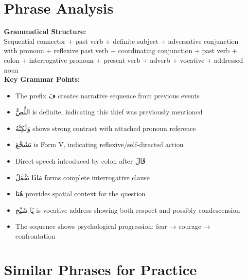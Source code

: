 \documentclass[letterpaper,12pt]{article}
\begin{document}
\section{Phrase Analysis}
\begin{tcolorbox}[colback=boxcolor,colframe=headercolor,breakable]
\textbf{Grammatical Structure:}\\
Sequential connector + past verb + definite subject + adversative conjunction with pronoun + reflexive past verb + coordinating conjunction + past verb + colon + interrogative pronoun + present verb + adverb + vocative + addressed noun \\

\textbf{Key Grammar Points:}
\begin{itemize}
\item The prefix \textarabic{فَ} creates narrative sequence from previous events
\item \textarabic{اللِّصُّ} is definite, indicating this thief was previously mentioned
\item \textarabic{وَلَكِنَّهُ} shows strong contrast with attached pronoun reference
\item \textarabic{تَشَجَّعَ} is Form V, indicating reflexive/self-directed action
\item Direct speech introduced by colon after \textarabic{قَالَ}
\item \textarabic{مَاذَا تَفْعَلُ} forms complete interrogative clause
\item \textarabic{هُنَا} provides spatial context for the question
\item \textarabic{يَا شَيْخ} is vocative address showing both respect and possibly condescension
\item The sequence shows psychological progression: fear → courage → confrontation
\end{itemize}
\end{tcolorbox}

\section{Similar Phrases for Practice}
\end{document}
